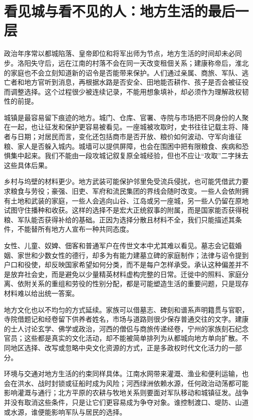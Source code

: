 \section{看见城与看不见的人：地方生活的最后一层}
\label{sec:eastern-jin-depth-local-lives}

政治年序常以都城陷落、皇帝即位和将军出师为节点，地方生活的时间却未必同步。洛阳失守后，远在江南的村落不会在同一天改变租佃关系；建康称帝后，淮北的家庭也不会立刻知道新的诏令是否能带来保护。人们通过亲属、商旅、军队、逃亡者和地方官听到消息，再根据水路是否安全、田地能否耕作、孩子是否会被征役而调整选择。这个过程很少被连续记录，不能用想象填补，却必须作为理解政权韧性的前提。

城镇是最容易留下痕迹的地方。城门、仓库、官署、寺院与市场把不同身份的人聚在一起，也让征发和保护更容易被看见。一座城被攻取时，史书往往记载主将、降者与日期；对居民而言，变化还包括商市是否开放、粮价如何波动、守军向谁征粮、家人是否躲入城内。城墙可以提供屏障，也会在围困中把有限粮食、疾病和恐惧集中起来。我们不能由一段攻城记叙复原全城经验，但也不应让“攻取”二字抹去这些具体后果。

乡村与坞壁的材料更少。地方武装可能保护邻里免受流兵侵扰，也可能凭借武力要求粮食与劳役；豪强、旧吏、军府和流民集团的界线会随时改变。一些人会依附拥有土地和武装的家庭，一些人会逃向山谷、江岛或另一座城，另一些人仍留在原地试图守住播种和收获。这样的选择不是宏大正统叙事的附属，而是国家能否获得税粮、军队能否获得补给的基础。正因为选择分散且材料不全，我们只能描述其条件，不能替所有地方人宣布一种共同态度。

女性、儿童、奴婢、佃客和普通军户在传世文本中尤其难以看见。墓志会记载婚姻、家世和少数女性的德行，却多为有能力建墓立碑的家庭制作；法律与诏令提到户口和役使，却反映国家希望如何分类，而不是每户怎样承受。承认这种偏差并不是放弃社会史，而是避免以少量精英材料虚构完整的日常。迁徙中的照料、家庭分离、依附关系的重组和劳役的性别分配，都是可能塑造生活的重要问题，只是现存材料难以给出统一答案。

地方文化也以不均匀的方式延续。家族可以借墓志、碑刻和谱系声明籍贯与官职，寺院借题记和经卷留下供养者姓名，市场与道路则很少保存普通交往的文字。建康的士人讨论玄学、佛学或政治，河西的僧侣与商旅传递经卷，宁州的家族刻石纪念官员；这些都是真实的文化活动，却不能被简单排列为从都城向地方单向扩散。不同地区选择、改写或忽略中央文化资源的方式，正是多政权时代文化活力的一部分。

环境与交通对地方生活的约束同样具体。江南水网带来灌溉、渔业和便利运输，也会在洪水、战时封锁或征船时成为风险；河西绿洲依赖水源，任何政治动荡都可能影响灌溉与通行；北方平原的农耕与牧地关系则要面对军队移动和城镇征发。战争并没有取消这些条件，只是让它们更容易成为争夺对象。谁控制渡口、堤防、山道或水源，谁便能影响军队与居民的选择。

